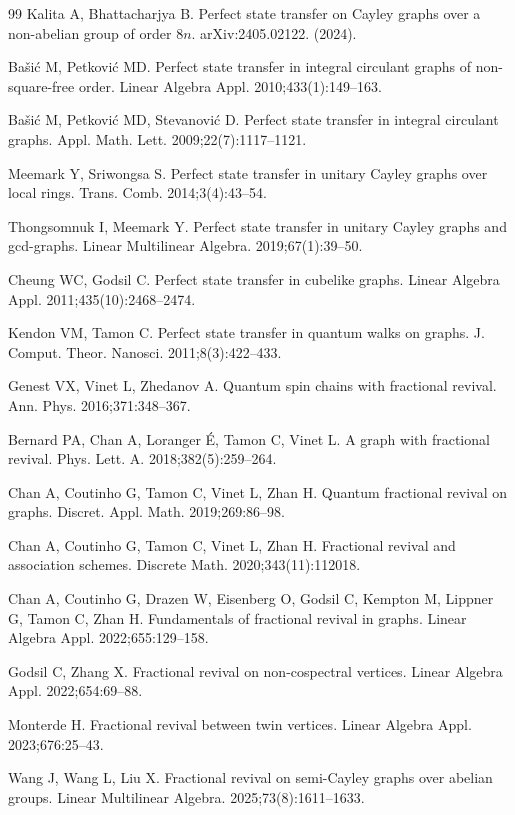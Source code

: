 \documentclass[12pt]{amsart}
\numberwithin{equation}{section}
\theoremstyle{definition}
\theoremstyle{definition} \numberwithin{equation}{section}
\begin{document}
\begin{thebibliography}{99}
 Kalita A, Bhattacharjya B. Perfect state transfer on Cayley graphs over a non-abelian group of order $8 n$. arXiv:2405.02122. (2024).

 Ba{\v{s}}i{\'c} M, Petkovi{\'c} MD. Perfect state transfer in integral circulant graphs of non-square-free order. Linear Algebra Appl. 2010;433(1):149--163.

 Ba{\v{s}}i{\'c} M, Petkovi{\'c} MD, Stevanovi{\'c} D. Perfect state transfer in integral circulant graphs. Appl. Math. Lett. 2009;22(7):1117--1121.

 Meemark Y, Sriwongsa S. Perfect state transfer in unitary Cayley graphs over local rings. Trans. Comb. 2014;3(4):43--54.

 Thongsomnuk I,  Meemark Y. Perfect state transfer in unitary Cayley graphs and gcd-graphs. Linear Multilinear Algebra. 2019;67(1):39--50.

 Cheung WC, Godsil C. Perfect state transfer in cubelike graphs. Linear Algebra Appl. 2011;435(10):2468--2474.

 Kendon VM, Tamon C. Perfect state transfer in quantum walks on graphs. J. Comput. Theor. Nanosci. 2011;8(3):422--433.

 Genest VX, Vinet L, Zhedanov A. Quantum spin chains with fractional revival. Ann. Phys. 2016;371:348--367.

 Bernard PA, Chan A, Loranger {\'E}, Tamon C, Vinet L. A graph with fractional revival. Phys. Lett. A. 2018;382(5):259--264.

 Chan A, Coutinho G, Tamon C, Vinet L, Zhan H. Quantum fractional revival on graphs. Discret. Appl. Math. 2019;269:86--98.

 Chan A, Coutinho G, Tamon C, Vinet L, Zhan H. Fractional revival and association schemes. Discrete Math. 2020;343(11):112018.

 Chan A, Coutinho G, Drazen W, Eisenberg O, Godsil C, Kempton M, Lippner G, Tamon C, Zhan H. Fundamentals of fractional revival in graphs. Linear Algebra Appl. 2022;655:129--158.

 Godsil C, Zhang X. Fractional revival on non-cospectral vertices. Linear Algebra Appl. 2022;654:69--88.

 Monterde H. Fractional revival between twin vertices. Linear Algebra Appl. 2023;676:25--43.

 Wang J, Wang L, Liu X. Fractional revival on semi-Cayley graphs over abelian groups. Linear Multilinear Algebra. 2025;73(8):1611--1633.


\end{thebibliography}
\end{document}
